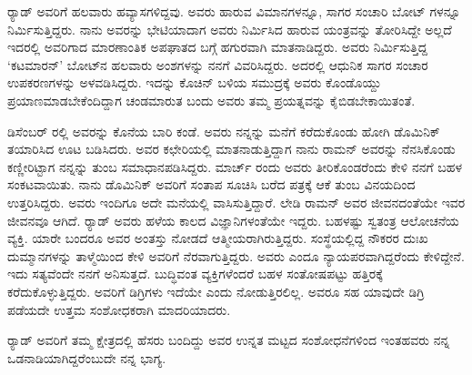 ರ‍್ಯಾಡ್ ಅವರಿಗೆ ಹಲವಾರು ಹವ್ಯಾಸಗಳಿದ್ದವು. ಅವರು ಹಾರುವ ವಿಮಾನಗಳನ್ನೂ, ಸಾಗರ ಸಂಚಾರಿ ಬೋಟ್ ಗಳನ್ನೂ ನಿರ್ಮಿಸುತ್ತಿದ್ದರು. ನಾನು ಅವರನ್ನು ಭೇಟಿಯಾದಾಗ ಅವರು ನಿರ್ಮಿಸಿದ ಹಾರುವ ಯಂತ್ರವನ್ನು ತೋರಿಸಿದ್ದೇ ಅಲ್ಲದೆ ಇದರಲ್ಲಿ ಅವರಿಗಾದ ಮಾರಣಾಂತಿಕ ಅಪಘಾತದ ಬಗ್ಗೆ ಹಗುರವಾಗಿ ಮಾತನಾಡಿದ್ದರು. ಅವರು ನಿರ್ಮಿಸುತ್ತಿದ್ದ ‘ಕಟಮಾರನ್’ ಬೋಟ್‍ನ ಹಲವಾರು ಅಂಶಗಳನ್ನು ನನಗೆ ವಿವರಿಸಿದ್ದರು. ಅದರಲ್ಲಿ ಆಧುನಿಕ ಸಾಗರ ಸಂಚಾರ ಉಪಕರಣಗಳನ್ನು ಅಳವಡಿಸಿದ್ದರು. ಇದನ್ನು ಕೊಚಿನ್ ಬಳಿಯ ಸಮುದ್ರಕ್ಕೆ ಅವರು ಕೊಂಡೊಯ್ದು ಪ್ರಯಾಣಮಾಡಬೇಕೆಂದಿದ್ದಾಗ ಚಂಡಮಾರುತ ಬಂದು ಅವರು ತಮ್ಮ ಪ್ರಯತ್ನವನ್ನು ಕೈಬಿಡಬೇಕಾಯಿತಂತೆ.

ಡಿಸೆಂಬರ್ ರಲ್ಲಿ ಅವರನ್ನು ಕೊನೆಯ ಬಾರಿ ಕಂಡೆ. ಅವರು ನನ್ನನ್ನು ಮನೆಗೆ ಕರೆದುಕೊಂಡು ಹೋಗಿ ಡೊಮಿನಿಕ್ ತಯಾರಿಸಿದ ಊಟ ಬಡಿಸಿದರು. ಅವರ ಕಛೇರಿಯಲ್ಲಿ ಮಾತನಾಡುತ್ತಿದ್ದಾಗ ನಾನು ರಾಮನ್ ಅವರನ್ನು ನೆನಸಿಕೊಂಡು ಕಣ್ಣೀರಿಟ್ಟಾಗ ನನ್ನನ್ನು ತುಂಬ ಸಮಾಧಾನಪಡಿಸಿದ್ದರು.  ಮಾರ್ಚ್  ರಂದು ಅವರು ತೀರಿಕೊಂಡರೆಂದು ಕೇಳಿ ನನಗೆ ಬಹಳ ಸಂಕಟವಾಯಿತು. ನಾನು ಡೊಮಿನಿಕ್ ಅವರಿಗೆ ಸಂತಾಪ ಸೂಚಿಸಿ ಬರೆದ ಪತ್ರಕ್ಕೆ ಆಕೆ ತುಂಬ ವಿನಯದಿಂದ ಉತ್ತರಿಸಿದ್ದರು. ಅವರು ಇಂದಿಗೂ ಅದೇ ಮನೆಯಲ್ಲಿ ವಾಸಿಸುತ್ತಿದ್ದಾರೆ. ಲೇಡಿ ರಾಮನ್ ಅವರ ಜೀವನದಂತೆಯೇ ಇವರ ಜೀವನವೂ ಆಗಿದೆ. ರ‍್ಯಾಡ್ ಅವರು ಹಳೆಯ ಕಾಲದ ವಿಜ್ಞಾನಿಗಳಂತೆಯೇ ಇದ್ದರು. ಬಹಳಷ್ಟು ಸ್ವತಂತ್ರ ಆಲೋಚನೆಯ ವ್ಯಕ್ತಿ. ಯಾರೇ ಬಂದರೂ ಅವರ ಅಂತಸ್ತು ನೋಡದೆ ಆತ್ಮೀಯರಾಗಿರುತ್ತಿದ್ದರು. ಸಂಸ್ಥೆಯಲ್ಲಿದ್ದ ನೌಕರರ ದುಃಖ ದುಮ್ಮಾನಗಳನ್ನು ತಾಳ್ಮೆಯಿಂದ ಕೇಳಿ ಅವರಿಗೆ ನೆರವಾಗುತ್ತಿದ್ದರು. ಅವರು ಎಂದೂ ನ್ಯಾಯಪರವಾಗಿದ್ದರೆಂದು ಕೇಳಿದ್ದೇನೆ. ಇದು ಸತ್ಯವೆಂದೇ ನನಗೆ ಅನಿಸುತ್ತದೆ. ಬುದ್ಧಿವಂತ ವ್ಯಕ್ತಿಗಳೆಂದರೆ ಬಹಳ ಸಂತೋಷಪಟ್ಟು ಹತ್ತಿರಕ್ಕೆ ಕರೆದುಕೊಳ್ಳುತ್ತಿದ್ದರು. ಅವರಿಗೆ ಡಿಗ್ರಿಗಳು ಇದೆಯೇ ಎಂದು ನೋಡುತ್ತಿರಲಿಲ್ಲ. ಅವರೂ ಸಹ ಯಾವುದೇ ಡಿಗ್ರಿ ಪಡೆಯದೇ ಉತ್ತಮ ಸಂಶೋಧಕರಾಗಿ ಮಾದರಿಯಾದರು.

ರ‍್ಯಾಡ್ ಅವರಿಗೆ ತಮ್ಮ ಕ್ಷೇತ್ರದಲ್ಲಿ ಹೆಸರು ಬಂದಿದ್ದು ಅವರ ಉನ್ನತ ಮಟ್ಟದ ಸಂಶೋಧನೆಗಳಿಂದ ಇಂತಹವರು ನನ್ನ ಒಡನಾಡಿಯಾಗಿದ್ದರೆಂಬುದೇ ನನ್ನ ಭಾಗ್ಯ.

